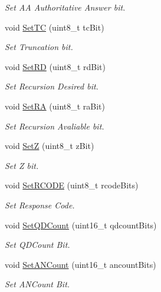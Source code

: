 \begin{DoxyCompactItemize}
\begin{DoxyCompactList}\small\item\em Set A\-A Authoritative Answer bit. \end{DoxyCompactList}\item 
void \hyperlink{classns3_1_1DnsPlusHeader_a5902c88c45f698ddea33524ab548a7d9}{Set\-T\-C} (uint8\-\_\-t tc\-Bit)
\begin{DoxyCompactList}\small\item\em Set Truncation bit. \end{DoxyCompactList}\item 
void \hyperlink{classns3_1_1DnsPlusHeader_ad7e284af8733c294da48aa30a6587233}{Set\-R\-D} (uint8\-\_\-t rd\-Bit)
\begin{DoxyCompactList}\small\item\em Set Recursion Desired bit. \end{DoxyCompactList}\item 
void \hyperlink{classns3_1_1DnsPlusHeader_ae3027f5af8724d06e2e1df355ae0a853}{Set\-R\-A} (uint8\-\_\-t ra\-Bit)
\begin{DoxyCompactList}\small\item\em Set Recursion Avaliable bit. \end{DoxyCompactList}\item 
void \hyperlink{classns3_1_1DnsPlusHeader_aae30ef6d451eec678278171ed7a5fe6c}{Set\-Z} (uint8\-\_\-t z\-Bit)
\begin{DoxyCompactList}\small\item\em Set Z bit. \end{DoxyCompactList}\item 
void \hyperlink{classns3_1_1DnsPlusHeader_a83fb23f26dc34870c1bf6e1284b32ef5}{Set\-R\-C\-O\-D\-E} (uint8\-\_\-t rcode\-Bits)
\begin{DoxyCompactList}\small\item\em Set Response Code. \end{DoxyCompactList}\item 
void \hyperlink{classns3_1_1DnsPlusHeader_a975e84f17140d5c7ba171edd64b7919e}{Set\-Q\-D\-Count} (uint16\-\_\-t qdcount\-Bits)
\begin{DoxyCompactList}\small\item\em Set Q\-D\-Count Bit. \end{DoxyCompactList}\item 
void \hyperlink{classns3_1_1DnsPlusHeader_a49a171a0aa8582dcf6a44bdfde783c7a}{Set\-A\-N\-Count} (uint16\-\_\-t ancount\-Bits)
\begin{DoxyCompactList}\small\item\em Set A\-N\-Count Bit. \end{DoxyCompactList}\item 

\end{DoxyCompactItemize}
